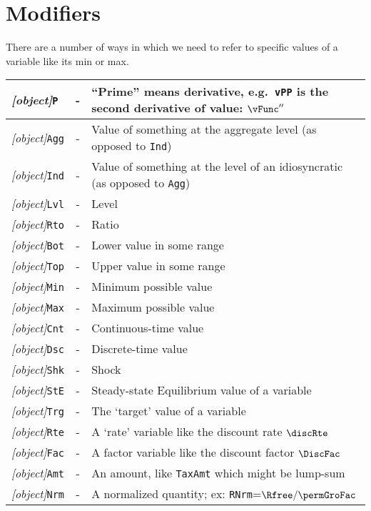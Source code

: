 \documentclass[12pt]{\econtex}
\begin{document}
\hypertarget{Modifiers}{}
\section{Modifiers}

There are a number of ways in which we need to refer to specific values of a variable like its min or max.  

\begin{table}[ht]
  \centering
  \begin{tabular}{|>{\ttfamily}lcl|}
    \hline
 \textit{[object]}\texttt{P} & - & ``Prime'' means derivative, e.g.\ \texttt{vPP} is the second derivative of value: $\vFunc^{\prime\prime}$
\\    \hline
    \textit{[object]}\texttt{Agg} & - & Value of something at the aggregate level (as opposed to \texttt{Ind})
    \\ \textit{[object]}\texttt{Ind} & - & Value of something at the level of an idiosyncratic (as opposed to \texttt{Agg})
    \\ \textit{[object]}\texttt{Lvl} & - & Level 
    \\ \textit{[object]}\texttt{Rto} & - & Ratio 
    \\ \textit{[object]}\texttt{Bot} & - & Lower value in some range 
    \\ \textit{[object]}\texttt{Top} & - & Upper value in some range 
    \\ \textit{[object]}\texttt{Min} & - & Minimum possible value 
    \\ \textit{[object]}\texttt{Max} & - & Maximum possible value 
    \\ \textit{[object]}\texttt{Cnt} & - & Continuous-time value
    \\ \textit{[object]}\texttt{Dsc} & - & Discrete-time value
    \\ \textit{[object]}\texttt{Shk} & - & Shock 
    \\ \textit{[object]}\texttt{StE} & - & Steady-state Equilibrium value of a variable
    \\ \textit{[object]}\texttt{Trg} & - & The `target' value of a variable 
    \\ \textit{[object]}\texttt{Rte} & - & A `rate' variable like the discount rate $\discRte$
    \\ \textit{[object]}\texttt{Fac} & - & A factor variable like the discount factor $\DiscFac$
    \\ \textit{[object]}\texttt{Amt} & - & An amount, like \texttt{TaxAmt} which might be lump-sum
    \\ \textit{[object]}\texttt{Nrm} & - & A normalized quantity; ex: \texttt{RNrm}=$\Rfree/\permGroFac$

\end{tabular}
\end{table}
\end{document}
